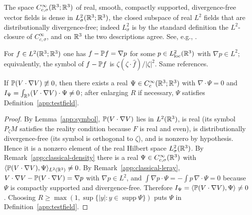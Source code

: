 \begin{remark}\label{app:classical-density}
The space $C^\infty_{c,\sigma}(\mathbb R^3;\mathbb R^3)$ of real, smooth, compactly
supported, divergence-free vector fields is dense in
$L^2_\sigma(\mathbb R^3;\mathbb R^3)$, the closed subspace of real $L^2$ fields that
are distributionally divergence-free; indeed $L^2_\sigma$ is by the
standard definition the $L^2$-closure of $C^\infty_{c,\sigma}$, and on
$\mathbb R^3$ the two descriptions agree. See, e.g.,
\cite{Temam,LadyzhenskayaBook,ConstantinFoias}.
\end{remark}

\begin{remark}
\label{app:classical-leray}
For $f\in L^2(\mathbb R^3;\mathbb R^3)$ one has $f-\mathbb P f=\nabla p$ for some
$p\in L^2_{\rm loc}(\mathbb R^3)$ with $\nabla p\in L^2$; equivalently, the
symbol of $f-\mathbb P f$ is $\zeta(\zeta\cdot\hat f)/|\zeta|^2$. Same
references.
\end{remark}

\begin{lemma}\label{app:testexists}
If $\mathbb P(V\cdot\nabla V)\not\equiv0$, then there exists a real
$\Psi\in C^\infty_c(\mathbb R^3;\mathbb R^3)$ with $\nabla\cdot\Psi=0$ and
$I_\Psi=\int_{\mathbb R^3}(V\cdot\nabla V)\cdot\Psi\neq0$; after enlarging $R$
if necessary, $\Psi$ satisfies Definition~\ref{app:testfield}.
\end{lemma}

\begin{proof}
By Lemma~\ref{app:symbol}, $\mathbb P(V\cdot\nabla V)$ lies in $L^2(\mathbb R^3)$,
is real (its symbol $P_\zeta M$ satisfies the reality condition because
$F$ is real and even), is distributionally divergence-free (its symbol
is orthogonal to $\zeta$), and is nonzero by hypothesis. Hence it is a
nonzero element of the real Hilbert space $L^2_\sigma(\mathbb R^3)$. By
Remark~\ref{app:classical-density} there is a real
$\Psi\in C^\infty_{c,\sigma}(\mathbb R^3)$ with
$\langle\mathbb P(V\cdot\nabla V),\Psi\rangle_{L^2(\mathbb R^3)}\neq0$. By
Remark~\ref{app:classical-leray},
$V\cdot\nabla V-\mathbb P(V\cdot\nabla V)=\nabla p$ with $\nabla p\in L^2$, and
$\int\nabla p\cdot\Psi=-\int p\,\nabla\cdot\Psi=0$ because $\Psi$ is
compactly supported and divergence-free. Therefore
$I_\Psi=\langle\mathbb P(V\cdot\nabla V),\Psi\rangle\neq0$. Choosing
$R\ge\max(1,\sup\{|y|:y\in\operatorname{supp}\Psi\})$ puts $\Psi$ in
Definition~\ref{app:testfield}.
\end{proof}

